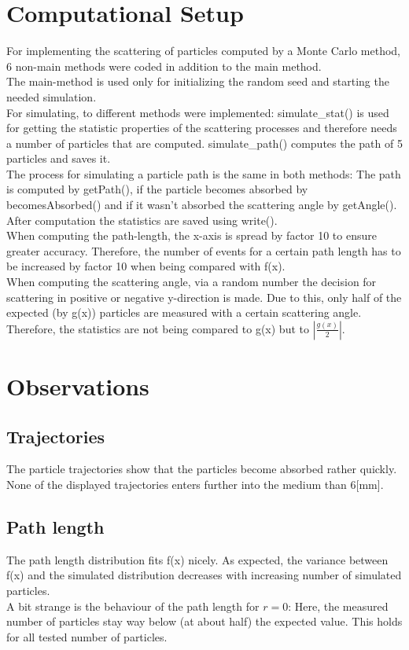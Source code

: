 \documentclass{article}
\begin{document}
	\section{Computational Setup}
		For implementing the scattering of particles computed by a Monte Carlo method, 6 non-main methods were coded in addition to the main method.\\
		The main-method is used only for initializing the random seed and starting the needed simulation.\\
		For simulating, to different methods were implemented: simulate\_stat() is used for getting the statistic properties of the scattering processes and therefore needs a number of particles that are computed. simulate\_path() computes the path of 5 particles and saves it.\\
		The process for simulating a particle path is the same in both methods: The path is computed by getPath(), if the particle becomes absorbed by becomesAbsorbed() and if it wasn't absorbed the scattering angle by getAngle().\\
		After computation the statistics are saved using write().\\
		
		When computing the path-length, the x-axis is spread by factor 10 to ensure greater accuracy. Therefore, the number of events for a certain path length has to be increased by factor 10 when being compared with f(x).\\
		When computing the scattering angle, via a random number the decision for scattering in positive or negative y-direction is made. Due to this, only half of the expected (by g(x)) particles are measured with a certain scattering angle. Therefore, the statistics are not being compared to g(x) but to $|\frac{g(x)}{2}|$.
	\section{Observations}
	\subsection{Trajectories}
		The particle trajectories show that the particles become absorbed rather quickly. None of the displayed trajectories enters further into the medium than 6[mm].
	\subsection{Path length}
		The path length distribution fits f(x) nicely. As expected, the variance between f(x) and the simulated distribution decreases with increasing number of simulated particles.\\
		A bit strange is the behaviour of the path length for $r=0$: Here, the measured number of particles stay way below (at about half) the expected value. This holds for all tested number of particles.
\end{document}
